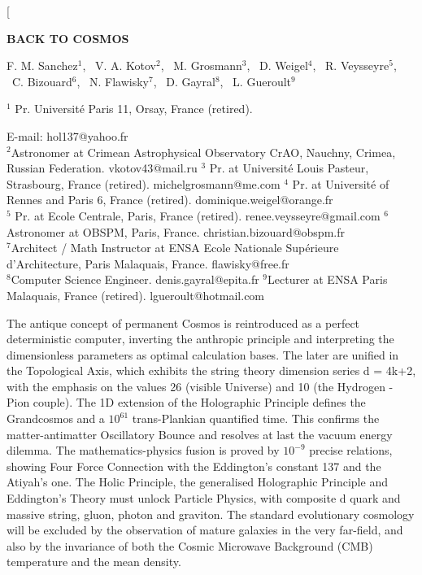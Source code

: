 \documentclass[twoside,draft]{article}
\begin{document}
\begin{sloppypar}

\renewcommand{\refname}{References}
\renewcommand{\tablename}{\small Table}
\renewcommand{\figurename}{\small Fig.}
\renewcommand{\contentsname}{Contents}


\twocolumn[%
\begin{center}
\renewcommand{\baselinestretch}{0.93}
{\Large\bfseries BACK TO COSMOS

}\par
\renewcommand{\baselinestretch}{1.0}
\bigskip
F. M. Sanchez$^1\!$, \ V. A. Kotov$^2\!$, \ M. Grosmann$^3$, \ D. Weigel$^4$, \ R. Veysseyre$^5$,\\ \ C. Bizouard$^6$, \ N. Flawisky$^7$, \ D. Gayral$^8$, \ L. Gueroult$^9$\\
{\footnotesize  $^1$ Pr. Universit\'{e} Paris 11, Orsay, France (retired).\rule{0pt}{12pt}
E-mail: hol137@yahoo.fr\\
$^2$Astronomer at Crimean Astrophysical Observatory CrAO, Nauchny, Crimea, Russian Federation. vkotov43@mail.ru
$^3$ Pr. at Universit\'{e} Louis Pasteur, Strasbourg, France (retired). michelgrosmann@me.com
$^4$ Pr. at Universit\'{e} of Rennes and Paris 6, France (retired). dominique.weigel@orange.fr
\\ $^5$ Pr. at Ecole Centrale, Paris, France (retired). renee.veysseyre@gmail.com
$^6$Astronomer at OBSPM, Paris, France. christian.bizouard@obspm.fr
\\ $^7$Architect / Math Instructor at ENSA Ecole Nationale Sup\'{e}rieure d'Architecture, Paris Malaquais, France. flawisky@free.fr
\\$^8$Computer Science Engineer. denis.gayral@epita.fr
$^9$Lecturer at ENSA Paris Malaquais, France (retired). lgueroult@hotmail.com

}\par
\medskip
{\small\parbox{11cm}{%


The antique concept of permanent Cosmos is reintroduced as a perfect deterministic computer, inverting the anthropic principle and interpreting the dimensionless parameters as optimal calculation bases. The later are unified in the Topological Axis, which exhibits the string theory dimension series d = 4k+2, with the emphasis on the values 26 (visible Universe) and 10 (the Hydrogen - Pion couple). The 1D extension of the Holographic Principle defines the Grandcosmos and a $10^{61}$ trans-Plankian quantified time. This confirms the matter-antimatter Oscillatory Bounce and resolves at last the vacuum energy dilemma. The mathematics-physics fusion is proved by $10^{-9}$ precise relations, showing Four Force Connection with the Eddington's constant 137 and the Atiyah's one. The Holic Principle, the generalised Holographic Principle and Eddington's Theory must unlock Particle Physics, with composite d quark and massive string, gluon, photon and graviton. The standard evolutionary cosmology will be excluded by the observation of mature galaxies in the very far-field, and also by the invariance of both the Cosmic Microwave Background (CMB) temperature and the mean density.  

}}
\end{center}
\end{sloppypar}
\end{document}
